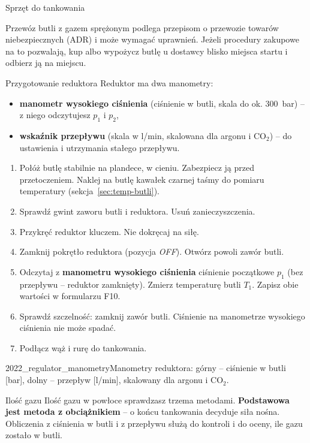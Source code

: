 \begin{sekcja}{Sprzęt do tankowania}
\begin{uwaga}Przewóz butli z gazem sprężonym podlega przepisom o przewozie towarów niebezpiecznych (ADR) i może wymagać uprawnień. Jeżeli procedury zakupowe na to pozwalają, kup albo wypożycz butlę u dostawcy blisko miejsca startu i odbierz ją na miejscu.\end{uwaga}
\end{sekcja}

\begin{sekcja}{Przygotowanie reduktora}
Reduktor ma dwa manometry:
\begin{itemize}
  \item \textbf{manometr wysokiego ciśnienia} (ciśnienie w butli, skala do ok. \SI{300}{bar}) -- z niego odczytujesz $p_1$ i $p_2$,
  \item \textbf{wskaźnik przepływu} (skala w l/min, skalowana dla argonu i CO$_2$) -- do ustawienia i utrzymania stałego przepływu.
\end{itemize}

\begin{enumerate}
  \item Połóż butlę stabilnie na plandece, w cieniu. Zabezpiecz ją przed przetoczeniem. Naklej na butlę kawałek czarnej taśmy do pomiaru temperatury (sekcja~\ref{sec:temp-butli}).
  \item Sprawdź gwint zaworu butli i reduktora. Usuń zanieczyszczenia.
  \item Przykręć reduktor kluczem. Nie dokręcaj na siłę.
  \item Zamknij pokrętło reduktora (pozycja \emph{OFF}). Otwórz powoli zawór butli.
  \item Odczytaj z \textbf{manometru wysokiego ciśnienia} ciśnienie początkowe $p_1$ (bez przepływu -- reduktor zamknięty). Zmierz temperaturę butli $T_1$. Zapisz obie wartości w formularzu F10.
  \item Sprawdź szczelność: zamknij zawór butli. Ciśnienie na manometrze wysokiego ciśnienia nie może spadać.
  \item Podłącz wąż i rurę do tankowania.
\end{enumerate}

{2022_regulator_manometry}{Manometry reduktora: górny -- ciśnienie w butli [bar], dolny -- przepływ [l/min], skalowany dla argonu i CO$_2$.}
\end{sekcja}

\begin{sekcja}{Ilość gazu}
Ilość gazu w powłoce sprawdzasz trzema metodami. \textbf{Podstawowa jest metoda z obciążnikiem} -- o końcu tankowania decyduje siła nośna. Obliczenia z ciśnienia w butli i z przepływu służą do kontroli i do oceny, ile gazu zostało w butli.
\end{sekcja}

